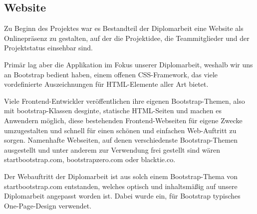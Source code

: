 \subsection{Website}
Zu Beginn des Projektes war es Bestandteil der Diplomarbeit eine Website als
Onlinepräsenz zu gestalten, auf der die Projektidee, die Teammitglieder und der
Projektstatus einsehbar sind.

Primär lag aber die Applikation im Fokus unserer Diplomarbeit, weshalb wir uns
an Bootstrap bedient haben, einem offenen CSS-Framework, das viele vordefinierte
Auszeichnungen für HTML-Elemente aller Art bietet.

Viele Frontend-Entwickler veröffentlichen ihre eigenen Bootstrap-Themen, also
mit bootstrap-Klassen desginte, statische HTML-Seiten und machen es Anwendern
möglich, diese bestehenden Frontend-Webseiten für eigene Zwecke umzugestalten
und schnell für einen schönen und einfachen Web-Auftritt zu sorgen. Namenhafte
Webseiten, auf denen verschiedenste Bootstrap-Themen ausgestellt und unter
anderem zur Verwendung frei gestellt sind wären startbootstrap.com,
bootstrapzero.com oder blacktie.co.

Der Webauftritt der Diplomarbeit ist aus solch einem Bootstrap-Thema von
startbootstrap.com entstanden, welches optisch und inhaltsmäßig auf unsere
Diplomarbeit angepasst worden ist. Dabei wurde ein, für Bootstrap typisches
One-Page-Design verwendet.

